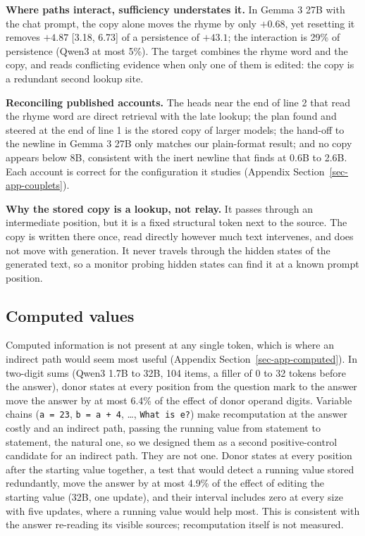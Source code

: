 \documentclass[
]{article}
\begin{document}
\textbf{Where paths interact, sufficiency understates it.} In Gemma 3
27B with the chat prompt, the copy alone moves the rhyme by only
\(+0.68\), yet resetting it removes \(+4.87\) {[}3.18, 6.73{]} of a
persistence of \(+43.1\); the interaction is 29\% of persistence (Qwen3
at most 5\%). The target combines the rhyme word and the copy, and reads
conflicting evidence when only one of them is edited: the copy is a
redundant second lookup site.

\textbf{Reconciling published accounts.} The heads near the end of line
2 that read the rhyme word \citep{hanna2026latent} are direct retrieval
with the late lookup; the plan found and steered at the end of line 1
\citep{lindsey2025biology, maar2026plan} is the stored copy of larger
models; the hand-off to the newline in Gemma 3 27B only
\citep{ma2026plan} matches our plain-format result; and no copy appears
below 8B, consistent with the inert newline that
\citet{jacopin2026improvisation} finds at 0.6B to 2.6B. Each account is
correct for the configuration it studies (Appendix
Section~\ref{sec-app-couplets}).

\textbf{Why the stored copy is a lookup, not relay.} It passes through
an intermediate position, but it is a fixed structural token next to the
source. The copy is written there once, read directly however much text
intervenes, and does not move with generation. It never travels through
the hidden states of the generated text, so a monitor probing hidden
states can find it at a known prompt position.

\subsection{Computed values}\label{sec-computed}

Computed information is not present at any single token, which is where
an indirect path would seem most useful (Appendix
Section~\ref{sec-app-computed}). In two-digit sums (Qwen3 1.7B to 32B,
104 items, a filler of 0 to 32 tokens before the answer), donor states
at every position from the question mark to the answer move the answer
by at most 6.4\% of the effect of donor operand digits. Variable chains
(\texttt{a\ =\ 23}, \texttt{b\ =\ a\ +\ 4}, \ldots,
\texttt{What\ is\ e?}) make recomputation at the answer costly and an
indirect path, passing the running value from statement to statement,
the natural one, so we designed them as a second positive-control
candidate for an indirect path. They are not one. Donor states at every
position after the starting value together, a test that would detect a
running value stored redundantly, move the answer by at most 4.9\% of
the effect of editing the starting value (32B, one update), and their
interval includes zero at every size with five updates, where a running
value would help most. This is consistent with the answer re-reading its
visible sources; recomputation itself is not measured.
\end{document}
